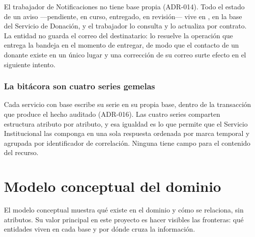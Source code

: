 \documentclass[11pt,a4paper]{article}
\newcommand{\id}[1]{\path{#1}}
\begin{document}
El trabajador de Notificaciones no tiene base propia (ADR-014). Todo el estado de un aviso ---pendiente, en curso, entregado, en revisión--- vive en \id{evento_notificacion}, en la base del Servicio de Donación, y el trabajador lo consulta y lo actualiza por contrato. La entidad no guarda el correo del destinatario: lo resuelve la operación que entrega la bandeja en el momento de entregar, de modo que el contacto de un donante existe en un único lugar y una corrección de su correo surte efecto en el siguiente intento.

\subsubsection*{La bitácora son cuatro series gemelas}

Cada servicio con base escribe su serie en su propia base, dentro de la transacción que produce el hecho auditado (ADR-016). Las cuatro series comparten estructura atributo por atributo, y esa igualdad es lo que permite que el Servicio Institucional las componga en una sola respuesta ordenada por marca temporal y agrupada por identificador de correlación. Ninguna tiene campo para el contenido del recurso.

\section{Modelo conceptual del dominio}
\label{sec:conceptual}

El modelo conceptual muestra qué existe en el dominio y cómo se relaciona, sin atributos. Su valor principal en este proyecto es hacer visibles las fronteras: qué entidades viven en cada base y por dónde cruza la información.
\end{document}
